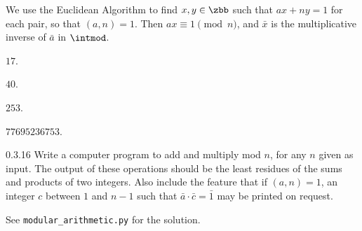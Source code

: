 \begin{sol}
    We use the Euclidean Algorithm to find $x, y \in \zbb$ such that $ax + ny = 1$ for each pair, so that $(a, n) = 1$.
	Then $ax \equiv 1 \pmod n$, and $\bar x$ is the multiplicative inverse of $\bar a$ in $\intmod$.
    \begin{subexercises}
        \item $17$.
        \item $40$.
        \item $253$.
        \item $77695236753$. \qedhere
    \end{subexercises}
\end{sol}

\begin{exercise}{0.3.16}
    Write a computer program to add and multiply mod $n$, for any $n$ given as input.
	The output of these operations should be the least residues of the sums and products of two integers.
	Also include the feature that if $(a, n) = 1$, an integer $c$ between $1$ and $n - 1$ such that $\bar a \cdot \bar c = \bar 1$ may be printed on request. 
    
\end{exercise}

\begin{sol}
    See \verb|modular_arithmetic.py| for the solution.
\end{sol}